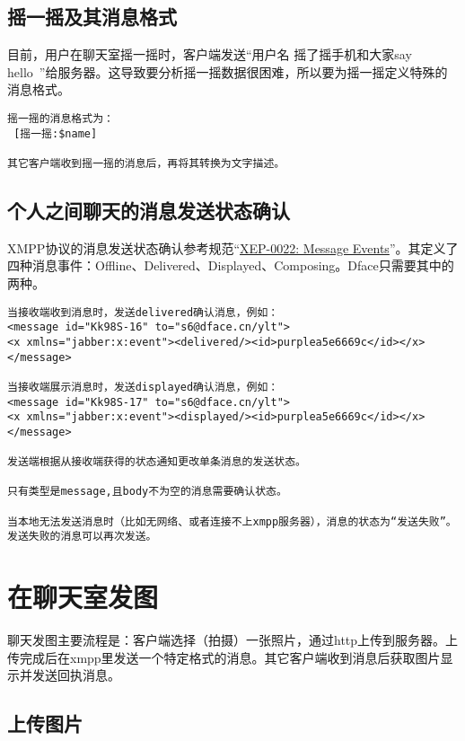 \documentclass[cs4size]{ctexartutf8}
\begin{document}
\subsection{摇一摇及其消息格式}
目前，用户在聊天室摇一摇时，客户端发送“用户名 摇了摇手机和大家say hello~”给服务器。这导致要分析摇一摇数据很困难，所以要为摇一摇定义特殊的消息格式。

\begin{verbatim}
摇一摇的消息格式为：
 [摇一摇:$name]

其它客户端收到摇一摇的消息后，再将其转换为文字描述。
\end{verbatim}



\subsection{个人之间聊天的消息发送状态确认}
XMPP协议的消息发送状态确认参考规范“\href{http://xmpp.org/extensions/xep-0022.html}{XEP-0022: Message Events}”。其定义了四种消息事件：Offline、Delivered、Displayed、Composing。Dface只需要其中的两种。

\begin{verbatim}
当接收端收到消息时，发送delivered确认消息，例如：
<message id="Kk98S-16" to="s6@dface.cn/ylt">
<x xmlns="jabber:x:event"><delivered/><id>purplea5e6669c</id></x>
</message>

当接收端展示消息时，发送displayed确认消息，例如：
<message id="Kk98S-17" to="s6@dface.cn/ylt">
<x xmlns="jabber:x:event"><displayed/><id>purplea5e6669c</id></x>
</message>

发送端根据从接收端获得的状态通知更改单条消息的发送状态。

只有类型是message,且body不为空的消息需要确认状态。

当本地无法发送消息时（比如无网络、或者连接不上xmpp服务器），消息的状态为“发送失败”。发送失败的消息可以再次发送。

\end{verbatim}


\section{在聊天室发图}
聊天发图主要流程是：客户端选择（拍摄）一张照片，通过http上传到服务器。上传完成后在xmpp里发送一个特定格式的消息。其它客户端收到消息后获取图片显示并发送回执消息。

\subsection{上传图片}
\end{document}
